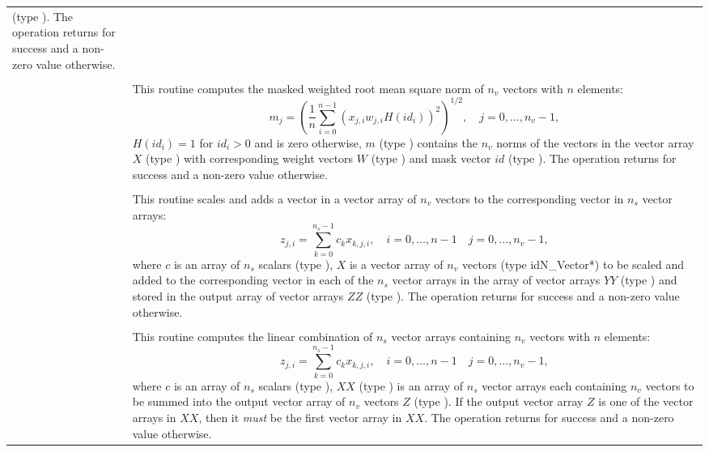 \begin{xtabular}{|p{\colonec}|p{\coltwoc}|}
(type ). The operation returns  for success and a non-zero
value otherwise.
\\[2mm]
 &  \\
& This routine computes the masked weighted root mean square norm of $n_v$
vectors with $n$ elements:
\begin{equation*}
m_j = \left( \frac1n \sum_{i=0}^{n-1} \left(x_{j,i} w_{j,i}
H(id_i)\right)^2 \right)^{1/2}, \quad j=0,\ldots,n_v-1,
\end{equation*}
$H(id_i)=1$ for $id_i > 0$ and is zero otherwise, $m$ (type ) contains
the $n_v$ norms of the vectors in the vector array $X$ (type ) with
corresponding weight vectors $W$ (type ) and mask vector $id$
(type ). The operation returns  for success and a non-zero
value otherwise.
\\[2mm]
 &  \\
& This routine scales and adds a vector in a vector array of $n_v$ vectors to
the corresponding vector in $n_s$ vector arrays:
\begin{equation*}
z_{j,i} = \sum_{k=0}^{n_s-1} c_k x_{k,j,i}, \quad i=0,\ldots,n-1 \quad j=0,\ldots,n_v-1,
\end{equation*}
where $c$ is an array of $n_s$ scalars (type ), $X$ is a vector
array of $n_v$ vectors (type id{N\_Vector*}) to be scaled and added to the
corresponding vector in each of the $n_s$ vector arrays in the array of vector
arrays $YY$ (type ) and stored in the output array of vector
arrays $ZZ$ (type ). The operation returns  for success
and a non-zero value otherwise.
\\[2mm]
 &  \\
& This routine computes the linear combination of $n_s$ vector arrays containing
$n_v$ vectors with $n$ elements:
\begin{equation*}
z_{j,i} = \sum_{k=0}^{n_s-1} c_k x_{k,j,i}, \quad i=0,\ldots,n-1 \quad j=0,\ldots,n_v-1,
\end{equation*}
where $c$ is an array of $n_s$ scalars (type ), $XX$
(type ) is an array of $n_s$ vector arrays each containing $n_v$
vectors to be summed into the output vector array of $n_v$ vectors $Z$ (type
). If the output vector array $Z$ is one of the vector arrays in
$XX$, then it \textit{must} be the first vector array in $XX$. The operation
returns  for success and a non-zero value otherwise.
\\
\end{xtabular}
\bigskip

